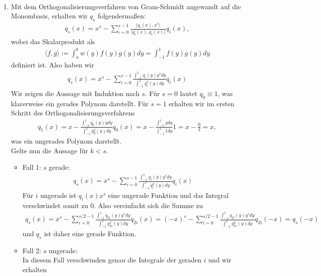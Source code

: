 \begin{solution}
\leavevmode \\
\begin{enumerate}[label = \textbf{\alph*)}]
\item
Mit dem Orthogonalisierungsverfahren von Gram-Schmidt angewandt auf die Monombasis,
erhalten wir $q_s$ folgendermaßen:
\begin{align*}
q_s(x) = x^s - \sum_{i = 0}^{s-1}\frac{\langle q_i(x), x^s\rangle}{\langle q_i(x), q_i(x) \rangle}q_i(x),
\end{align*}
wobei das Skalarprodukt als
\begin{align*}
  \langle f, g \rangle := \int_a^b w(y)f(y)g(y) dy = \int_{-1}^1 f(y)g(y) dy
\end{align*}
definiert ist. Also haben wir
\begin{align*}
  q_s(x) = x^s - \sum_{i = 0}^{s-1}\frac{\int_{-1}^1 q_i(y) y^s dy}{\int_{-1}^1 q_i^2(y) dy}q_i(x)
\end{align*}
Wir zeigen die Aussage mit Induktion nach $s$. Für $s = 0$ lautet $q_0 \equiv 1$,
was klarerweise ein gerades Polynom darstellt. Für $s = 1$ erhalten wir im ersten
Schritt des Orthogonalisierungsverfahrens
\begin{align*}
  q_1(x) = x - \frac{\int_{-1}^1 q_0(y) y dy}{\int_{-1}^1 q_0^2(y) dy}q_0(x)
  = x - \frac{\int_{-1}^1 y dy}{\int_{-1}^1 1 dy}1 = x - \frac{0}{2} = x,
\end{align*}
was ein ungerades Polynom darstellt. \\
Gelte nun die Aussage für $k < s$.
\begin{itemize}
  \item Fall 1: $s$ gerade:
  \begin{align*}
    q_s(x) = x^s - \sum_{i = 0}^{s-1}\frac{\int_{-1}^1 q_i(y) y^s dy}{\int_{-1}^1 q_i^2(y) dy}q_i(x)
  \end{align*}
  Für $i$ ungerade ist $q_i(x) x^s$ eine ungerade Funktion und das Integral verschwindet somit zu 0.
  Also vereinfacht sich die Summe zu
  \begin{align*}
    q_s(x) = x^s - \sum_{i = 0}^{s/2-1}\frac{\int_{-1}^1q_{2i}(y)y^s dy}{\int_{-1}^1q_{2i}^2(y)dy}q_{2i}(x)
    = (-x)^s - \sum_{i = 0}^{s/2-1}\frac{\int_{-1}^1 q_{2i}(y) y^s dy}{\int_{-1}^1 q_{2i}^2(y) dy}q_{2i}(-x)
    = q_s(-x)
  \end{align*}
  und $q_s$ ist daher eine gerade Funktion.
  \item Fall 2: $s$ ungerade: \\
  In diesem Fall verschwinden genau die Integrale der geraden $i$ und wir erhalten

\end{itemize}
\end{enumerate}
\end{solution}
